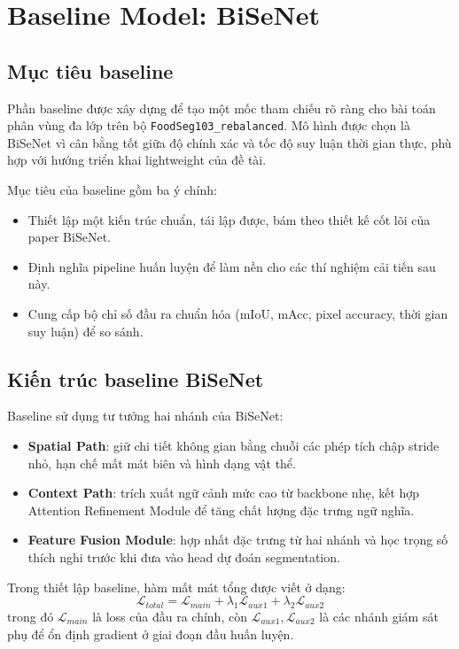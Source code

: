 \section{Baseline Model: BiSeNet}

\subsection{Mục tiêu baseline}
Phần baseline được xây dựng để tạo một mốc tham chiếu rõ ràng cho bài toán phân vùng đa lớp trên bộ \texttt{FoodSeg103\_rebalanced}. Mô hình được chọn là BiSeNet vì cân bằng tốt giữa độ chính xác và tốc độ suy luận thời gian thực, phù hợp với hướng triển khai lightweight của đề tài.

Mục tiêu của baseline gồm ba ý chính:
\begin{itemize}[leftmargin=1.5em]
    \item Thiết lập một kiến trúc chuẩn, tái lập được, bám theo thiết kế cốt lõi của paper BiSeNet.
    \item Định nghĩa pipeline huấn luyện để làm nền cho các thí nghiệm cải tiến sau này.
    \item Cung cấp bộ chỉ số đầu ra chuẩn hóa (mIoU, mAcc, pixel accuracy, thời gian suy luận) để so sánh.
\end{itemize}

\subsection{Kiến trúc baseline BiSeNet}
Baseline sử dụng tư tưởng hai nhánh của BiSeNet:
\begin{itemize}[leftmargin=1.5em]
    \item \textbf{Spatial Path}: giữ chi tiết không gian bằng chuỗi các phép tích chập stride nhỏ, hạn chế mất mát biên và hình dạng vật thể.
    \item \textbf{Context Path}: trích xuất ngữ cảnh mức cao từ backbone nhẹ, kết hợp Attention Refinement Module để tăng chất lượng đặc trưng ngữ nghĩa.
    \item \textbf{Feature Fusion Module}: hợp nhất đặc trưng từ hai nhánh và học trọng số thích nghi trước khi đưa vào head dự đoán segmentation.
\end{itemize}

Trong thiết lập baseline, hàm mất mát tổng được viết ở dạng:
\[
\mathcal{L}_{total} = \mathcal{L}_{main} + \lambda_1 \mathcal{L}_{aux1} + \lambda_2 \mathcal{L}_{aux2}
\]
trong đó $\mathcal{L}_{main}$ là loss của đầu ra chính, còn $\mathcal{L}_{aux1}, \mathcal{L}_{aux2}$ là các nhánh giám sát phụ để ổn định gradient ở giai đoạn đầu huấn luyện.

